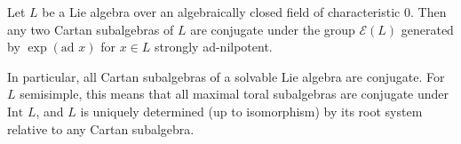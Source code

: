 Let $L$ be a Lie algebra over an algebraically closed field of characteristic 0. Then any two Cartan subalgebras of $L$ are conjugate under the group $\mathcal{E}(L)$ generated by $\exp(\text{ad } x)$ for $x \in L$ strongly ad-nilpotent.

In particular, all Cartan subalgebras of a solvable Lie algebra are conjugate. For $L$ semisimple, this means that all maximal toral subalgebras are conjugate under $\text{Int } L$, and $L$ is uniquely determined (up to isomorphism) by its root system relative to any Cartan subalgebra.
